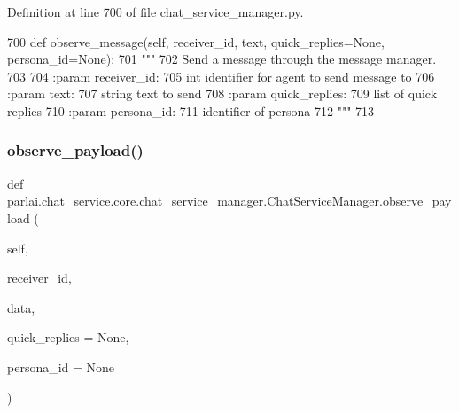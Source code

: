 Definition at line 700 of file chat\+\_\+service\+\_\+manager.\+py.


\begin{DoxyCode}
700     \textcolor{keyword}{def }observe\_message(self, receiver\_id, text, quick\_replies=None, persona\_id=None):
701         \textcolor{stringliteral}{"""}
702 \textcolor{stringliteral}{        Send a message through the message manager.}
703 \textcolor{stringliteral}{}
704 \textcolor{stringliteral}{        :param receiver\_id:}
705 \textcolor{stringliteral}{            int identifier for agent to send message to}
706 \textcolor{stringliteral}{        :param text:}
707 \textcolor{stringliteral}{            string text to send}
708 \textcolor{stringliteral}{        :param quick\_replies:}
709 \textcolor{stringliteral}{            list of quick replies}
710 \textcolor{stringliteral}{        :param persona\_id:}
711 \textcolor{stringliteral}{            identifier of persona}
712 \textcolor{stringliteral}{        """}
713 
\end{DoxyCode}
\mbox{\label{classparlai_1_1chat__service_1_1core_1_1chat__service__manager_1_1ChatServiceManager_ae4aa62ecd0ff74a95a9d259f2297eace}} 
\subsubsection{\texorpdfstring{observe\+\_\+payload()}{observe\_payload()}}
{\footnotesize\ttfamily def parlai.\+chat\+\_\+service.\+core.\+chat\+\_\+service\+\_\+manager.\+Chat\+Service\+Manager.\+observe\+\_\+payload (\begin{DoxyParamCaption}\item[{}]{self,  }\item[{}]{receiver\+\_\+id,  }\item[{}]{data,  }\item[{}]{quick\+\_\+replies = {\ttfamily None},  }\item[{}]{persona\+\_\+id = {\ttfamily None} }\end{DoxyParamCaption})}


